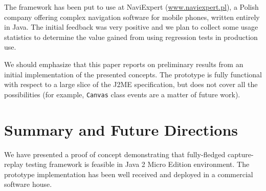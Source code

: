 \documentclass{llncs}
\newcommand{\customtextsc}[1]{{\scriptsize \MakeUppercase{#1}}}
\newcommand{\acro}[1]{\customtextsc{#1}}   %
\newcommand{\jme}{\acro{j2me}}             %
\newcommand{\class}[1]{\texttt{#1}}        %
\begin{document}
The framework has been put to use at NaviExpert (\url{www.naviexpert.pl}), a Polish company offering 
complex navigation software for mobile phones, written entirely in Java. The initial feedback was 
very positive and we plan to collect some usage statistics to determine the value gained
from using regression tests in production use.

We should emphasize that this paper reports on preliminary results from an initial implementation
of the presented concepts. The prototype is fully functional with respect to a large slice of the \jme{}
specification, but does not cover all the possibilities (for example, \class{Canvas} class events
are a matter of future work).


\section{Summary and Future Directions} %

We have presented a proof of concept demonstrating that fully-fledged capture-replay testing framework
is feasible in Java 2 Micro Edition environment. The prototype implementation has been well received and
deployed in a commercial software house.
\end{document}
